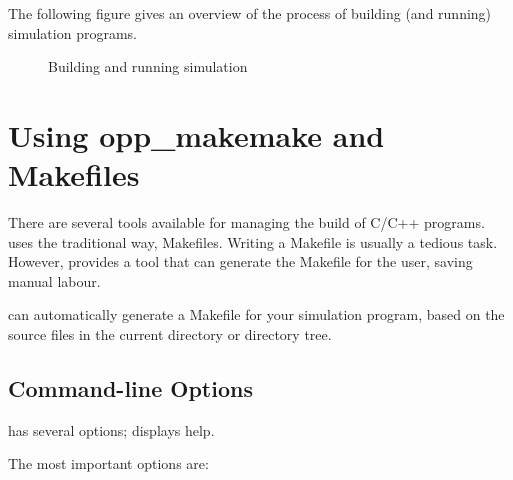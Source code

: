 The following figure gives an overview of the process of building
(and running) simulation programs.


\begin{figure}[htbp]
  \begin{center}
    
    \caption{Building and running simulation}
  \end{center}
\end{figure}

\section{Using opp\_makemake and Makefiles}
\label{sec:build-sim-progs:opp-makemake}

There are several tools available for managing the build of C/C++ programs.
{\opp} uses the traditional way, Makefiles. Writing a Makefile is usually a
tedious task. However, {\opp} provides a tool that can generate the
Makefile for the user, saving manual labour.

 can automatically generate a Makefile for your
simulation program, based on the source files in the current directory or
directory tree.

\subsection{Command-line Options}
\label{sec:build-sim-progs:makemake-options}

 has several options;
 displays help.

The most important options are:

